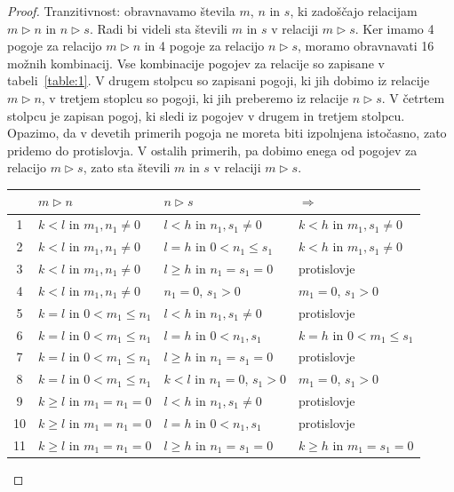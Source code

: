 \documentclass[mat2]{fmfdelo}
\begin{document}
\begin{proof}
Tranzitivnost: obravnavamo števila $m$,  $n$ in $s$, ki zadoščajo relacijam $m \triangleright n$ in $n \triangleright s$. Radi bi videli sta števili $m$ in $s$ v relaciji $m \triangleright s$. Ker imamo 4 pogoje za relacijo $m \triangleright n$ in 4 pogoje za relacijo $n \triangleright s$, moramo obravnavati 16 možnih kombinacij. Vse kombinacije pogojev za relacije so zapisane v tabeli~\ref{table:1}. V drugem stolpcu so zapisani pogoji, ki jih dobimo iz relacije $m \triangleright n$, v tretjem stoplcu so pogoji, ki jih preberemo iz relacije $n \triangleright s$. V četrtem stolpcu je zapisan pogoj, ki sledi iz pogojev v drugem in tretjem stolpcu. Opazimo, da v devetih primerih pogoja ne moreta biti izpolnjena istočasno, zato pridemo do protislovja. V ostalih primerih, pa dobimo enega od pogojev za relacijo $m \triangleright s$, zato sta števili $m$ in $s$ v relaciji $m \triangleright s$.
\renewcommand{\arraystretch}{1.2}
\begin{table}[h!]
\centering
\begin{tabular}{||c | l | l | l||} 
 \hline
  & $m \triangleright n$ & $n \triangleright s$ & $\Rightarrow$ \\ [0.5ex] 
 \hline\hline
 1 & $k<l$ in $m_1, n_1 \neq 0$ & $l<h$ in $n_1, s_1 \neq 0$ & $k<h$ in $m_1, s_1 \neq 0$ \\ 
 2 & $k<l$ in $m_1, n_1 \neq 0$ & $l=h$ in $0<n_1 \leq s_1$ & $k<h$ in $m_1, s_1 \neq 0$ \\
 3 & $k<l$ in $m_1, n_1 \neq 0$ & $l \geq h$ in $n_1 = s_1 = 0$ & protislovje \\
 4 & $k<l$ in $m_1, n_1 \neq 0$ & $n_1 = 0$, $s_1 > 0$ & $m_1 = 0$, $s_1 > 0$ \\
 5 & $k=l$ in $0<m_1 \leq n_1$ & $l<h$ in $n_1, s_1 \neq 0$ & protislovje \\ 
 6 & $k=l$ in $0<m_1 \leq n_1$ & $l=h$ in $0<n_1, s_1$ & $k=h$ in $0<m_1 \leq s_1$ \\
 7 & $k=l$ in $0<m_1 \leq n_1$ & $l \geq h$ in $n_1 = s_1 = 0$ & protislovje \\
 8 & $k=l$ in $0<m_1 \leq n_1$ & $k<l$ in $n_1 = 0$, $s_1 > 0$ & $m_1 = 0$, $s_1 > 0$ \\
 9 & $k \geq l$ in $m_1 = n_1 = 0$ & $l<h$ in $n_1, s_1 \neq 0$ & protislovje \\ 
 10 & $k \geq l$ in $m_1 = n_1 = 0$ & $l=h$ in $0<n_1, s_1$ & protislovje \\
 11 & $k \geq l$ in $m_1 = n_1 = 0$ & $l \geq h$ in $n_1 = s_1 = 0$ & $k \geq h$ in $m_1 = s_1 = 0$ \\

\end{tabular}
\end{table}
\end{proof}
\end{document}
